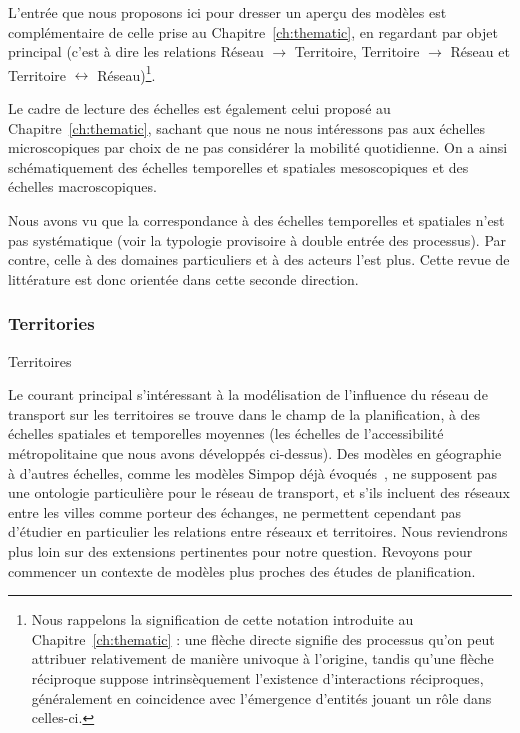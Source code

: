 

L'entrée que nous proposons ici pour dresser un aperçu des modèles est complémentaire de celle prise au Chapitre~\ref{ch:thematic}, en regardant par objet principal (c'est à dire les relations Réseau $\rightarrow$ Territoire, Territoire $\rightarrow$ Réseau et Territoire $\leftrightarrow$ Réseau)\footnote{Nous rappelons la signification de cette notation introduite au Chapitre~\ref{ch:thematic} : une flèche directe signifie des processus qu'on peut attribuer relativement de manière univoque à l'origine, tandis qu'une flèche réciproque suppose intrinsèquement l'existence d'interactions réciproques, généralement en coincidence avec l'émergence d'entités jouant un rôle dans celles-ci.}.

Le cadre de lecture des échelles est également celui proposé au Chapitre~\ref{ch:thematic}, sachant que nous ne nous intéressons pas aux échelles microscopiques par choix de ne pas considérer la mobilité quotidienne. On a ainsi schématiquement des échelles temporelles et spatiales mesoscopiques et des échelles macroscopiques.


Nous avons vu que la correspondance à des échelles temporelles et spatiales n'est pas systématique (voir la typologie provisoire à double entrée des processus). Par contre, celle à des domaines particuliers et à des acteurs l'est plus. Cette revue de littérature est donc orientée dans cette seconde direction.


\subsubsection{Territories}{Territoires}


Le courant principal s'intéressant à la modélisation de l'influence du réseau de transport sur les territoires se trouve dans le champ de la planification, à des échelles spatiales et temporelles moyennes (les échelles de l'accessibilité métropolitaine que nous avons développés ci-dessus). Des modèles en géographie à d'autres échelles, comme les modèles Simpop déjà évoqués~\cite{pumain2012multi}, ne supposent pas une ontologie particulière pour le réseau de transport, et s'ils incluent des réseaux entre les villes comme porteur des échanges, ne permettent cependant pas d'étudier en particulier les relations entre réseaux et territoires. Nous reviendrons plus loin sur des extensions pertinentes pour notre question. Revoyons pour commencer un contexte de modèles plus proches des études de planification.


